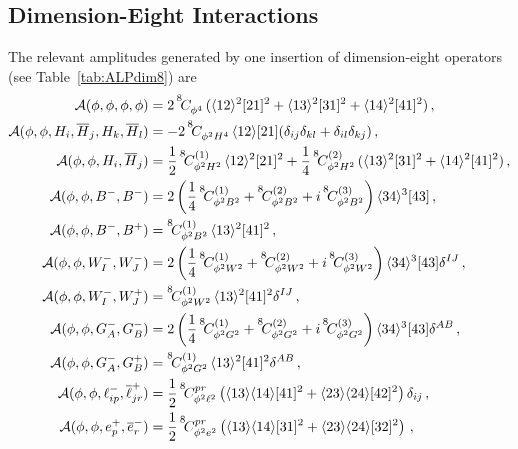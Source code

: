 \subsection{Dimension-Eight Interactions}

The relevant amplitudes generated by one insertion of dimension-eight operators (see Table~\ref{tab:ALPdim8}) are 
\begin{align}
    \mathcal A(\phi,\phi,\phi,\phi) &= 2\,\coef{8}{\phi^4}{}\,(\agl{1}{2}^2\sqr{2}{1}^2 + \agl{1}{3}^2\sqr{3}{1}^2 + \agl{1}{4}^2\sqr{4}{1}^2)\,,
    \\
    \mathcal A(\phi,\phi,H_i,\overline H_j,H_k,\overline H_l) &= -2\,\coef{8}{\phi^2 H^4}{}\,\agl{1}{2}\sqr{2}{1}(\delta_{ij}\delta_{kl}+\delta_{il}\delta_{kj})\,,
    \\
    \mathcal A(\phi,\phi,H_i,\overline H_j) &= \frac{1}{2}\,\coef{8}{\phi^2 H^2}{(1)}\,\agl{1}{2}^2\sqr{2}{1}^2 + \frac{1}{4}\,\coef{8}{\phi^2 H^2}{(2)}\,(\agl{1}{3}^2\sqr{3}{1}^2 + \agl{1}{4}^2\sqr{4}{1}^2)\,,
    \\
    \mathcal A(\phi,\phi,B^-,B^-) &= 2\left(\frac{1}{4}\,\coef{8}{\phi^2 B^2}{(1)}+\coef{8}{\phi^2 B^2}{(2)} + i\,\coef{8}{\phi^2 B^2}{(3)}\right)\agl{3}{4}^3 \sqr{4}{3}\,,
    \label{eq:ampl_d8_phi2B2(1)}
    \\
    \mathcal A(\phi,\phi,B^-,B^+) &= \coef{8}{\phi^2 B^2}{(1)}\,\agl{1}{3}^2\sqr{4}{1}^2\,,
    \label{eq:ampl_d8_phi2B2(2)}
    \\
    \mathcal A(\phi,\phi,W_I^-,W_J^-) &= 2\left(\frac{1}{4}\,\coef{8}{\phi^2 W^2}{(1)}+\coef{8}{\phi^2 W^2}{(2)} + i\,\coef{8}{\phi^2 W^2}{(3)}\right)\agl{3}{4}^3 \sqr{4}{3}\delta^{IJ}\,,
    \\
    \mathcal A(\phi,\phi,W_I^-,W_J^+) &= \coef{8}{\phi^2 W^2}{(1)}\,\agl{1}{3}^2\sqr{4}{1}^2\delta^{IJ} \,,
    \\
    \mathcal A(\phi,\phi,G_A^-,G_B^-) &= 2\left(\frac{1}{4}\,\coef{8}{\phi^2 G^2}{(1)}+\coef{8}{\phi^2 G^2}{(2)} + i\,\coef{8}{\phi^2 G^2}{(3)}\right)\agl{3}{4}^3 \sqr{4}{3}\delta^{AB}\,,
    \\
    \mathcal A(\phi,\phi,G_A^-,G_B^+) &= \coef{8}{\phi^2 G^2}{(1)}\,\agl{1}{3}^2\sqr{4}{1}^2 \delta^{AB} \,,
    \\
    \mathcal A(\phi,\phi,\ell^-_{ip},\overline \ell^+_{jr}) &= \frac{1}{2}\,\coef{8}{\phi^2 \ell^2}{pr}\left(\agl{1}{3}\agl{1}{4}\sqr{4}{1}^2 + \agl{2}{3}\agl{2}{4}\sqr{4}{2}^2\right)\delta_{ij}\,,
    \\
    \mathcal A(\phi,\phi,e^+_p,\overline e^-_r) &= \frac{1}{2}\,\coef{8}{\phi^2 e^2}{pr}\left(\agl{1}{3}\agl{1}{4}\sqr{3}{1}^2 + \agl{2}{3}\agl{2}{4}\sqr{3}{2}^2\right)\,,

\end{align}
